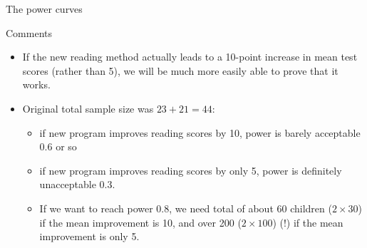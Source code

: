 \documentclass[unknownkeysallowed]{beamer}\usepackage[]{graphicx}\usepackage[]{color}
\begin{document}
\begin{frame}[fragile]{The power curves}
  
  
\end{frame}

\begin{frame}[fragile]{Comments}
  
  \begin{itemize}
  \item If the new reading method actually leads to a 10-point 
   increase in mean test scores (rather than 5), we will be much more
   easily able to prove that it works.
 \item Original total sample size was $23+21=44$:
   \begin{itemize}
   \item if new program improves reading scores by 10, power is barely
     acceptable 0.6 or so
   \item if new program improves reading scores by only 5, power is
     definitely unacceptable 0.3.
   \item If we want to reach power 0.8, we need total of about 60
     children ($2 \times 30$) if the mean improvement is 10, and over
     200 ($2 \times 100$) (!) if the mean improvement is only 5.
   \end{itemize}
  \end{itemize}
  
\end{frame}

\end{document}

